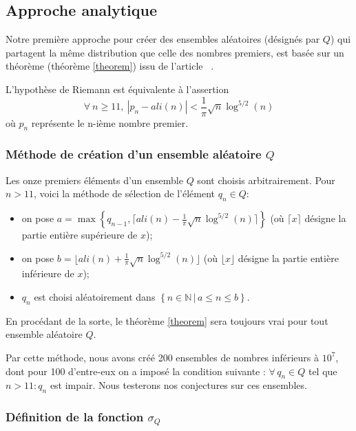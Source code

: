 \documentclass[../main.tex]{report}
\begin{document}

\subsection{Approche analytique}

Notre première approche pour créer des ensembles aléatoires (désignés par $Q$) qui partagent la même distribution que celle des nombres premiers, est basée sur un théorème (théorème \ref{theorem}) issu de l'article~\cite{article_prof} . 

\begin{Thm}
\label{theorem}
	L'hypothèse de Riemann est équivalente à l'assertion 
	\[
	\forall \ n \geqslant 11, \ |p_{n} - ali(n) | < \frac{1}{\pi} \sqrt{n} \log^{5/2}(n) 
	\]
	où $p_{n}$ représente le n-ième nombre premier.
\end{Thm}

\subsubsection{Méthode de création d'un ensemble aléatoire $Q$}

Les onze premiers éléments d'un ensemble $Q$ sont choisis arbitrairement. 
Pour $ n > 11 $, voici la méthode de sélection  de l'élément $q_{n} \in Q$: 
\begin{itemize}
	\item on pose $ a = \max \left\{ q_{n-1} ,\lceil{ali(n) - \frac{1}{\pi} \sqrt{n} \log^{5/2}(n) \rceil} \right\}$ 
	(où $\lceil x \rceil$ désigne la partie entière supérieure de $x$);
	\item on pose $ b = \lfloor ali(n) + \frac{1}{\pi} \sqrt{n} \log^{5/2}(n) \rfloor $
	(où $\lfloor x \rfloor$ désigne la partie entière inférieure de $x$);
	\item $ q_{n} $ est choisi aléatoirement dans $ \left\{ n\in \mathbb{N} \, | \, a \leqslant n \leqslant b \right\}$. 
\end{itemize}

En procédant de la sorte, le théorème \ref{theorem} sera toujours vrai pour tout ensemble aléatoire $Q$.

Par cette méthode, nous avons créé 200 ensembles de nombres inférieurs à $10^{7}$, dont pour 100 d'entre-eux on a imposé la condition suivante : $\forall \, q_{n} \in Q$ tel que  $n > 11 : q_{n}$ est impair. Nous testerons nos conjectures sur ces ensembles.

\subsubsection{Définition de la fonction $\sigma_{Q}$}
\end{document}
